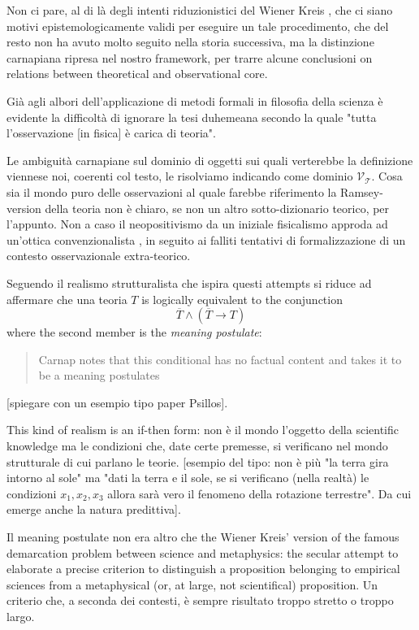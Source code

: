 Non ci pare, al di là degli intenti riduzionistici del Wiener Kreis \cite{Weinb}, che ci siano motivi epistemologicamente validi per eseguire un tale procedimento, che del resto non ha avuto molto seguito nella storia successiva, ma la distinzione carnapiana ripresa nel nostro framework, per trarre alcune conclusioni on relations between theoretical and observational core.

Già agli albori dell'applicazione di metodi formali in filosofia della scienza è evidente la difficoltà di ignorare la tesi duhemeana secondo la quale "tutta l'osservazione [in fisica] è carica di teoria". 

Le ambiguità carnapiane sul dominio di oggetti sui quali verterebbe la definizione viennese noi, coerenti col testo, le risolviamo indicando come dominio $\mathcal{V_T}$. Cosa sia il mondo puro delle osservazioni al quale farebbe riferimento la Ramsey-version della teoria non è chiaro, se non un altro sotto-dizionario teorico, per l'appunto. Non a caso il neopositivismo da un iniziale fisicalismo approda ad un'ottica convenzionalista \cite{?}, in seguito ai falliti tentativi di formalizzazione di un contesto osservazionale extra-teorico. 

Seguendo \cite{psillos} il realismo strutturalista che ispira questi attempts si riduce ad affermare che una teoria $T$ is logically equivalent to the conjunction
\[\overline{T} \land (\overline{T} \rightarrow T)
\] where the second member is the \emph{meaning postulate}:
\begin{quotation}
	Carnap notes that this conditional has no factual content and takes it to be a meaning postulates \cite{?}
\end{quotation}
[spiegare con un esempio tipo paper Psillos].

This kind of realism is an if-then form: non è il mondo l'oggetto della scientific knowledge ma le condizioni che, date certe premesse, si verificano nel mondo strutturale di cui parlano le teorie. [esempio del tipo: non è più "la terra gira intorno al sole" ma "dati la terra e il sole, se si verificano (nella realtà) le condizioni $x_1,x_2,x_3$ allora sarà vero il fenomeno della rotazione terrestre". Da cui emerge anche la natura predittiva]. 

Il meaning postulate non era altro che the Wiener Kreis' version of the famous demarcation problem between science and metaphysics: the secular attempt to elaborate a precise criterion to distinguish a proposition belonging to empirical sciences from a metaphysical (or, at large, not scientifical) proposition. Un criterio che, a seconda dei contesti, è sempre risultato troppo stretto o troppo largo. 

